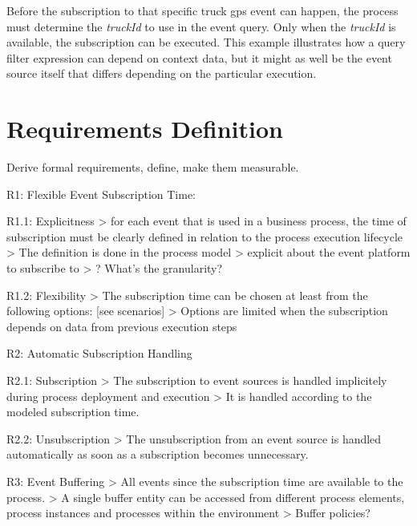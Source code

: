 
Before the subscription to that specific truck gps event can happen, the process must determine the \textit{truckId} to use in the event query. Only when the \textit{truckId} is available, the subscription can be executed. This example illustrates how a query filter expression can depend on context data, but it might as well be the event source itself that differs depending on the particular execution.




\section{Requirements Definition}
Derive formal requirements, define, make them measurable.

R1: Flexible Event Subscription Time:

R1.1: Explicitness
> for each event that is used in a business process, the time of subscription must be clearly defined in relation to the process execution lifecycle
> The definition is done in the process model
> explicit about the event platform to subscribe to
> ? What's the granularity?

R1.2: Flexibility
> The subscription time can be chosen at least from the following options: [see scenarios]
> Options are limited when the subscription depends on data from previous execution steps

R2: Automatic Subscription Handling

R2.1: Subscription
> The subscription to event sources is handled implicitely during process deployment and execution
> It is handled according to the modeled subscription time.

R2.2: Unsubscription
> The unsubscription from an event source is handled automatically as soon as a subscription becomes unnecessary.

R3: Event Buffering
> All events since the subscription time are available to the process.
> A single buffer entity can be accessed from different process elements, process instances and processes within the environment
> Buffer policies?

